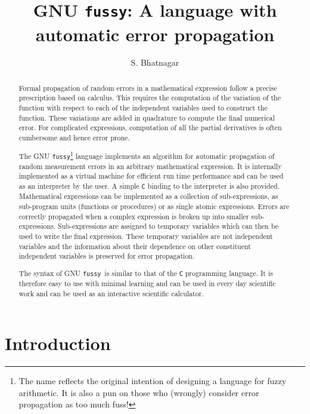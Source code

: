 \documentclass[11pt]{article}
\newcommand{\Fussy}{GNU {\tt fussy}}
\newcommand{\PDFVersion}  {\htmladdnormallinkfoot{PDF version}{http://www.aoc.nrao.edu/~sbhatnag/Softwares/fussy/fussy.pdf}}
\begin{document}
\title{{\Fussy}: A language with automatic error propagation}
\author{S. Bhatnagar}
\date{}
\maketitle
\normalsize

\begin{abstract} 
\pagestyle{empty} Formal propagation of random errors in a mathematical expression follow
a precise prescription based on calculus.  This requires the computation of the variation
of the function with respect to each of the independent variables used to construct the
function.  These variations are added in quadrature to compute the final numerical error.
For complicated expressions, computation of all the partial derivatives is often
cumbersome and hence error prone.

The \Fussy\footnote{The name reflects the original intention of designing a language for
  fuzzy arithmetic.  It is also a pun on those who (wrongly) consider error propagation
  as too much fuss!}  language implements an algorithm for automatic propagation of
random measurement errors in an arbitrary mathematical expression.  It is internally
implemented as a virtual machine for efficient run time performance and can be used as an
interpreter by the user.  A simple {\tt C} binding to the interpreter is also provided.
Mathematical expressions can be implemented as a collection of sub-expressions, as
sub-program units (functions or procedures) or as single atomic expressions.  Errors are
correctly propagated when a complex expression is broken up into smaller sub-expressions.
Sub-expressions are assigned to temporary variables which can then be used to write the
final expression.  These temporary variables are not independent variables and the
information about their dependence on other constituent independent variables is
preserved for error propagation.

The syntax of \Fussy\ is similar to that of the {\tt C} programming language.  It is
therefore easy to use with minimal learning and can be used in every day scientific work
and can be used as an interactive scientific calculator.
\end{abstract}
            
\newpage
\tableofcontents
\newpage

\section{Introduction}
\end{document}
